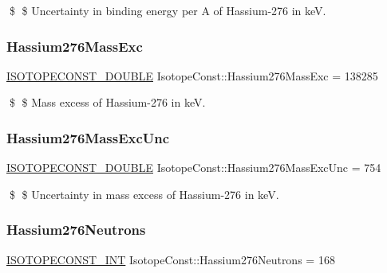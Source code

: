 \$ \$ Uncertainty in binding energy per A of Hassium-\/276 in keV. \mbox{\label{group___isotope_const-_hassium-_hs276_ga5770d79e83182ccaff54293a1d327553}} 
\subsubsection{\texorpdfstring{Hassium276\+Mass\+Exc}{Hassium276MassExc}}
{\footnotesize\ttfamily \mbox{\hyperlink{group___isotope_const-_macros_ga8f45a7272ce02c0b4c65c44636ed719a}{I\+S\+O\+T\+O\+P\+E\+C\+O\+N\+S\+T\+\_\+\+D\+O\+U\+B\+LE}} Isotope\+Const\+::\+Hassium276\+Mass\+Exc = 138285}

\$ \$ Mass excess of Hassium-\/276 in keV. \mbox{\label{group___isotope_const-_hassium-_hs276_ga6e61e28b9cd8cb5a97088e9086a889b7}} 
\subsubsection{\texorpdfstring{Hassium276\+Mass\+Exc\+Unc}{Hassium276MassExcUnc}}
{\footnotesize\ttfamily \mbox{\hyperlink{group___isotope_const-_macros_ga8f45a7272ce02c0b4c65c44636ed719a}{I\+S\+O\+T\+O\+P\+E\+C\+O\+N\+S\+T\+\_\+\+D\+O\+U\+B\+LE}} Isotope\+Const\+::\+Hassium276\+Mass\+Exc\+Unc = 754}

\$ \$ Uncertainty in mass excess of Hassium-\/276 in keV. \mbox{\label{group___isotope_const-_hassium-_hs276_gaa89ec51278194291a2d76fb249fea580}} 
\subsubsection{\texorpdfstring{Hassium276\+Neutrons}{Hassium276Neutrons}}
{\footnotesize\ttfamily \mbox{\hyperlink{group___isotope_const-_macros_ga5f18360b3e99483a35c32d789e62621c}{I\+S\+O\+T\+O\+P\+E\+C\+O\+N\+S\+T\+\_\+\+I\+NT}} Isotope\+Const\+::\+Hassium276\+Neutrons = 168}

